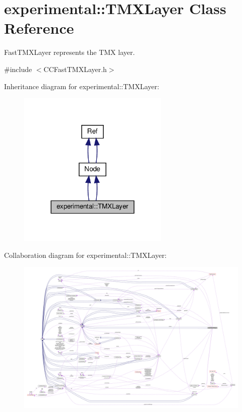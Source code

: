 \hypertarget{classexperimental_1_1TMXLayer}{}\section{experimental\+:\+:T\+M\+X\+Layer Class Reference}
\label{classexperimental_1_1TMXLayer}


Fast\+T\+M\+X\+Layer represents the T\+MX layer.  




{\ttfamily \#include $<$C\+C\+Fast\+T\+M\+X\+Layer.\+h$>$}



Inheritance diagram for experimental\+:\+:T\+M\+X\+Layer\+:
\nopagebreak
\begin{figure}[H]
\begin{center}
\leavevmode
\includegraphics[width=203pt]{classexperimental_1_1TMXLayer__inherit__graph}
\end{center}
\end{figure}


Collaboration diagram for experimental\+:\+:T\+M\+X\+Layer\+:
\nopagebreak
\begin{figure}[H]
\begin{center}
\leavevmode
\includegraphics[width=350pt]{classexperimental_1_1TMXLayer__coll__graph}
\end{center}
\end{figure}
